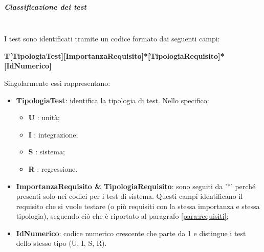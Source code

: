 \subparagraph{Classificazione dei test} \mbox{} \\
I test sono identificati tramite un codice formato dai seguenti campi:
\begin{center}
\textbf{T[TipologiaTest][ImportanzaRequisito]*[TipologiaRequisito]*[IdNumerico]} 
\end{center}
Singolarmente essi rappresentano:
\begin{itemize}
	\item \textbf{TipologiaTest}: identifica la tipologia di test. Nello specifico:
		\begin{itemize}
			\item \textbf{U} : unità;
			\item \textbf{I} : integrazione;
			\item \textbf{S} : sistema;
			\item \textbf{R} : regressione.	 
		\end{itemize}
	\item \textbf{ImportanzaRequisito \& TipologiaRequisito}: sono seguiti da '*' perché presenti solo nei codici per i test di sistema. Questi campi identificano il requisito che si vuole testare (o più requisiti con la stessa importanza e stessa tipologia), seguendo ciò che è riportato al paragrafo \ref{para:requisiti};
	\item \textbf{IdNumerico}: codice numerico crescente che parte da 1 e distingue i test dello stesso tipo (U, I, S, R).
\end{itemize}
 
